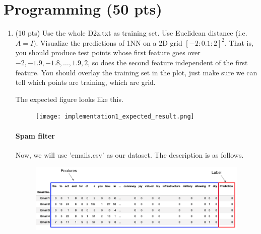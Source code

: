 \documentclass[a4paper]{article}
\theoremstyle{definition}
\begin{document}
\section{Programming (50 pts)}
\begin{enumerate}
	\item (10 pts) Use the whole D2z.txt as training set.  Use Euclidean distance (i.e. $A=I$).
	Visualize the predictions of 1NN on a 2D grid $[-2:0.1:2]^2$.
	That is, you should produce test points whose first feature goes over $-2, -1.9, -1.8, \ldots, 1.9, 2$, so does the second feature independent of the first feature.
	You should overlay the training set in the plot, just make sure we can tell which points are training, which are grid.
	
	The expected figure looks like this.
	\begin{figure}[h]
		\centering
		\texttt{[image: implementation1\_expected\_result.png]}
	\end{figure}
	
	\paragraph{Spam filter} Now, we will use 'emails.csv' as our dataset. The description is as follows.
	\begin{figure}[h]
		\centering
		\includegraphics[width=\linewidth]{email_head.png}
	\end{figure}
	

\end{enumerate}
\end{document}
